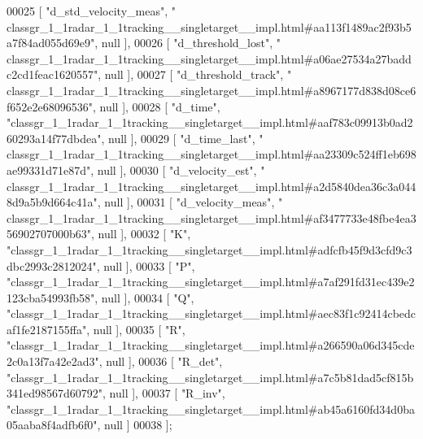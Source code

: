 \begin{DoxyCode}
00025     [ \textcolor{stringliteral}{"d\_std\_velocity\_meas"}, \textcolor{stringliteral}{"
      classgr\_1\_1radar\_1\_1tracking\_\_singletarget\_\_impl.html#aa113f1489ac2f93b5a7f84ad055d69e9"}, null ],
00026     [ \textcolor{stringliteral}{"d\_threshold\_lost"}, \textcolor{stringliteral}{"
      classgr\_1\_1radar\_1\_1tracking\_\_singletarget\_\_impl.html#a06ae27534a27baddc2cd1feac1620557"}, null ],
00027     [ \textcolor{stringliteral}{"d\_threshold\_track"}, \textcolor{stringliteral}{"
      classgr\_1\_1radar\_1\_1tracking\_\_singletarget\_\_impl.html#a8967177d838d08ce6f652e2e68096536"}, null ],
00028     [ \textcolor{stringliteral}{"d\_time"}, \textcolor{stringliteral}{"classgr\_1\_1radar\_1\_1tracking\_\_singletarget\_\_impl.html#aaf783c09913b0ad260293a14f77dbdea"}, 
      null ],
00029     [ \textcolor{stringliteral}{"d\_time\_last"}, \textcolor{stringliteral}{"
      classgr\_1\_1radar\_1\_1tracking\_\_singletarget\_\_impl.html#aa23309c524ff1eb698ae99331d71e87d"}, null ],
00030     [ \textcolor{stringliteral}{"d\_velocity\_est"}, \textcolor{stringliteral}{"
      classgr\_1\_1radar\_1\_1tracking\_\_singletarget\_\_impl.html#a2d5840dea36c3a0448d9a5b9d664c41a"}, null ],
00031     [ \textcolor{stringliteral}{"d\_velocity\_meas"}, \textcolor{stringliteral}{"
      classgr\_1\_1radar\_1\_1tracking\_\_singletarget\_\_impl.html#af3477733e48fbe4ea356902707000b63"}, null ],
00032     [ \textcolor{stringliteral}{"K"}, \textcolor{stringliteral}{"classgr\_1\_1radar\_1\_1tracking\_\_singletarget\_\_impl.html#adfcfb45f9d3cfd9c3dbc2993c2812024"}, null 
      ],
00033     [ \textcolor{stringliteral}{"P"}, \textcolor{stringliteral}{"classgr\_1\_1radar\_1\_1tracking\_\_singletarget\_\_impl.html#a7af291fd31ec439e2123cba54993fb58"}, null 
      ],
00034     [ \textcolor{stringliteral}{"Q"}, \textcolor{stringliteral}{"classgr\_1\_1radar\_1\_1tracking\_\_singletarget\_\_impl.html#aec83f1c92414cbedcaf1fe2187155ffa"}, null 
      ],
00035     [ \textcolor{stringliteral}{"R"}, \textcolor{stringliteral}{"classgr\_1\_1radar\_1\_1tracking\_\_singletarget\_\_impl.html#a266590a06d345cde2c0a13f7a42e2ad3"}, null 
      ],
00036     [ \textcolor{stringliteral}{"R\_det"}, \textcolor{stringliteral}{"classgr\_1\_1radar\_1\_1tracking\_\_singletarget\_\_impl.html#a7c5b81dad5cf815b341ed98567d60792"}, 
      null ],
00037     [ \textcolor{stringliteral}{"R\_inv"}, \textcolor{stringliteral}{"classgr\_1\_1radar\_1\_1tracking\_\_singletarget\_\_impl.html#ab45a6160fd34d0ba05aaba8f4adfb6f0"}, 
      null ]
00038 ];
\end{DoxyCode}
